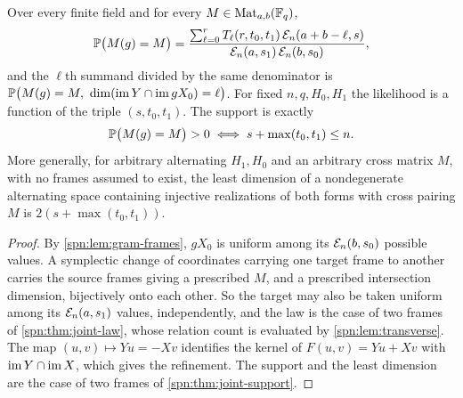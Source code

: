 \begin{corollary}\label{spn:thm:complete-law}
Over every finite field and for every $M\in\operatorname{Mat}_{a,b}(\mathbb{F}_q)$,
\begin{equation}\label{spn:eq:complete-law}
 \mathbb{P}\bigl(M(g)=M\bigr)=
 \frac{\sum_{\ell=0}^{r}T_\ell(r,t_0,t_1)\,\mathcal{E}_n(a+b-\ell,s)}
 {\mathcal{E}_n(a,s_1)\,\mathcal{E}_n(b,s_0)} ,
\end{equation}
and the $\ell$th summand divided by the same denominator is
$\mathbb{P}\bigl(M(g)=M,\ \dim(\operatorname{im} Y\cap\operatorname{im} gX_0)=\ell\bigr)$. For fixed
$n,q,H_0,H_1$ the likelihood is a function of the triple $(s,t_0,t_1)$. The
support is exactly
\begin{equation}\label{spn:eq:complete-support}
 \mathbb{P}\bigl(M(g)=M\bigr)>0\iff s+\max(t_0,t_1)\le n .
\end{equation}
More generally, for arbitrary alternating $H_1,H_0$ and an arbitrary cross
matrix $M$, with no frames assumed to exist, the least dimension of a
nondegenerate alternating space containing injective realizations of both
forms with cross pairing $M$ is $2(s+\max(t_0,t_1))$.
\end{corollary}

\begin{proof}
By \cref{spn:lem:gram-frames}, $gX_0$ is uniform among its
$\mathcal{E}_n(b,s_0)$ possible values. A symplectic change of coordinates
carrying one target frame to another carries the source frames giving a
prescribed $M$, and a prescribed intersection dimension, bijectively onto each
other. So the target may also be taken uniform among its $\mathcal{E}_n(a,s_1)$
values, independently, and the law is the case of two frames of
\cref{spn:thm:joint-law}, whose relation count is evaluated by
\cref{spn:lem:transverse}. The map $(u,v)\mapsto Yu=-Xv$ identifies the kernel of
$F(u,v)=Yu+Xv$ with $\operatorname{im} Y\cap\operatorname{im} X$, which gives the refinement. The support
and the least dimension are the case of two frames of \cref{spn:thm:joint-support}.
\end{proof}

